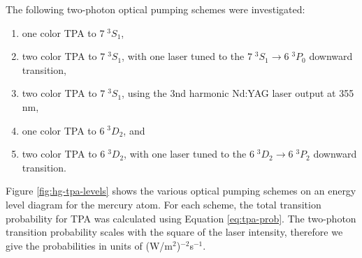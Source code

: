 The following two-photon optical pumping schemes were investigated: 
\renewcommand{\theenumi}{(\alph{enumi})}
\renewcommand{\labelenumi}{\theenumi}
\begin{enumerate}
  \item one color TPA to $7 \; ^3S_1$,
  \item two color TPA to $7 \; ^3S_1$, with one laser tuned to the
    $7 \; ^3S_1 \rightarrow 6 \; ^3P_0$ downward transition,
  \item two color TPA to $7 \; ^3S_1$, using the  3nd harmonic Nd:YAG
    laser output at 355 nm,
  \item one color TPA to $6 \; ^3D_2$, and
  \item two color TPA to $6 \; ^3D_2$, with one laser tuned to the
    $6 \; ^3D_2 \rightarrow 6 \; ^3P_2$ downward transition.
\end{enumerate}
Figure \ref{fig:hg-tpa-levels} shows the various optical pumping
schemes on an energy level diagram for the mercury atom.  For each
scheme, the total transition probability for TPA was calculated using
Equation \ref{eq:tpa-prob}.  The two-photon transition probability
scales with the square of the laser intensity, therefore we give the
probabilities in units of (W/m$^2$)$^{-2}$s$^{-1}$.

